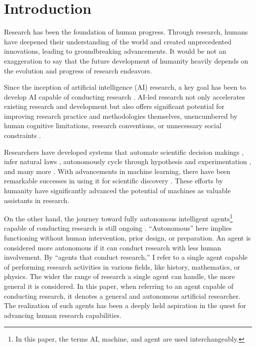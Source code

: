 \section{Introduction}
Research has been the foundation of human progress. Through research, humans have deepened their understanding of the world and created unprecedented innovations, leading to groundbreaking advancements. It would be not an exaggeration to say that the future development of humanity heavily depends on the evolution and progress of research endeavors.

Since the inception of artificial intelligence (AI) research, a key goal has been to develop AI capable of conducting research \cite{zenil2023future}. AI-led research not only accelerates existing research and development but also offers significant potential for improving research practice and methodologies themselves, unencumbered by human cognitive limitations, research conventions, or unnecessary social constraints \cite{zenil2023future,kitano2021nobel}.

Researchers have developed systems that automate scientific decision makings \cite{lindsay1993dendral}, infer natural laws \cite{langley1987scientific}, autonomously cycle through hypothesis and experimentation \cite{king2004functional}, and many more \cite{zenil2023future,zenil2023}. With advancements in machine learning, there have been remarkable successes in using it for scientific discovery \cite{wang2023scientific,xu2021artificial,zhang2023artificial,ai4science2023impact}. These efforts by humanity have significantly advanced the potential of machines as valuable assistants in research.

On the other hand, the journey toward fully autonomous intelligent agents\footnote{
In this paper, the terms AI, machine, and agent are used interchangeably.
} capable of conducting research is still ongoing \cite{zenil2023future,coley2020autonomousII}. ``Autonomous'' here implies functioning without human intervention, prior design, or preparation. An agent is considered more autonomous if it can conduct research with less human involvement. By ``agents that conduct research,'' I refer to a single agent capable of performing research activities in various fields, like history, mathematics, or physics. The wider the range of research a single agent can handle, the more general it is considered. In this paper, when referring to an agent capable of conducting research, it denotes a general and autonomous artificial researcher. The realization of such agents has been a deeply held aspiration in the quest for advancing human research capabilities.

